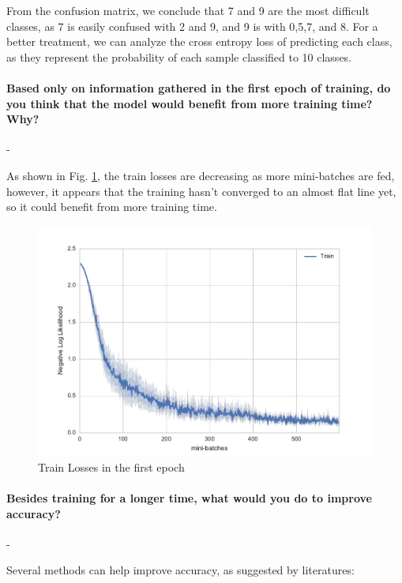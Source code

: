 \documentclass[11pt]{article}
\begin{document}
From the confusion matrix, we conclude that 7 and 9 are the most difficult classes, as 7 is easily confused with 2 and 9, and 9 is with 0,5,7, and 8. For a better treatment, we can analyze the cross entropy loss of predicting each class, as they represent the probability of each sample classified to 10 classes.

\paragraph{Based only on information gathered in the first epoch of training, do you think that the model would benefit from more training time? Why?} - 

As shown in Fig. \ref{fig:exp1}, the train losses are decreasing as more mini-batches are fed, however, it appears that the training hasn't converged to an almost flat line yet, so it could benefit from more training time.

\begin{figure}
    \includegraphics[width=.9\textwidth]{Figs/exp1}
    \caption{Train Losses in the first epoch}\label{fig:exp1}
\end{figure}

\paragraph{Besides training for a longer time, what would you do to improve accuracy?} -

Several methods can help improve accuracy, as suggested by literatures:
\end{document}
